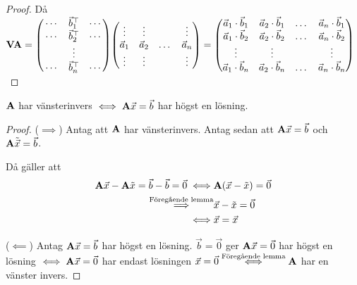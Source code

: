 \begin{lemma}
\begin{proof}
		Då $\mathbf{V}\mathbf{A}=\qty(\begin{matrix}
			\,\cdots&\vec{b}_1^\top&\cdots\,\\
			\,\cdots&\vec{b}_2^\top&\cdots\,\\
			&\vdots&\\
			\,\cdots&\vec{b}_n^\top&\cdots\,\\
		\end{matrix})\qty(\begin{matrix}
			\vdots&\vdots&&\vdots\\
			\vec{a}_1&\vec{a}_2&\dots&\vec{a}_n\\
			\vdots&\vdots&&\vdots
		\end{matrix})=\qty(\begin{matrix}
			\vec{a}_1\cdot\vec{b}_1&\vec{a}_2\cdot\vec{b}_1&\dots&\vec{a}_n\cdot\vec{b}_1\\
			\vec{a}_1\cdot\vec{b}_2&\vec{a}_2\cdot\vec{b}_2&\dots&\vec{a}_n\cdot\vec{b}_2\\
			\vdots&\vdots&&\vdots\\
			\vec{a}_1\cdot\vec{b}_n&\vec{a}_2\cdot\vec{b}_n&\dots&\vec{a}_n\cdot\vec{b}_n\\
		\end{matrix})$
	\end{proof}
\end{lemma}

\begin{corollary}
	$\mathbf{A}$ har vänsterinvers $\iff\mathbf{A}\vec{x}=\vec{b}$ har högst en lösning.

	\begin{proof}
		($\implies$) Antag att $\mathbf{A}$ har vänsterinvers. Antag sedan att
		$\mathbf{A}\vec{x}=\vec{b}$ och $\mathbf{A}\tilde{\vec{x}}=\vec{b}$.

		Då gäller att
		\begin{align*}
			\mathbf{A}\vec{x}-\mathbf{A}\tilde{x}=\vec{b}-\vec{b}=\vec{0}
			\iff&\mathbf{A}(\vec{x}-\tilde{x})=\vec{0}\\
			\stackrel{\text{Föregående lemma}}{\implies}&\vec{x}-\tilde{x}=\vec{0}\\
			\iff&\vec{x}=\vec{x}
		\end{align*}

		($\impliedby$) Antag $\mathbf{A}\vec{x}=\vec{b}$ har högst en lösning.
		$\vec{b}=\vec{0}$ ger $\mathbf{A}\vec{x}=\vec{0}$ har högst en lösning $\iff\mathbf{A}\vec{x}=\vec{0}$
		har endast lösningen $\vec{x}=\vec{0}\stackrel{\text{Föregående lemma}}{\iff}\mathbf{A}$
		har en vänster invers.
	\end{proof}
\end{corollary}
